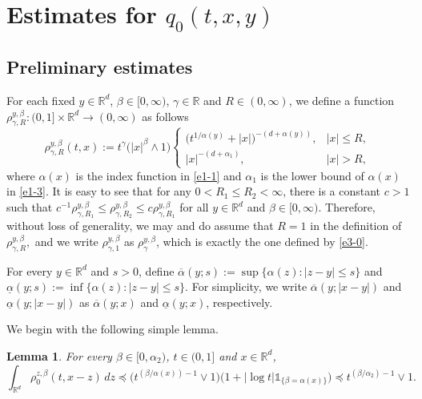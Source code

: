\documentclass[a4paper,11pt]{amsart}
\renewcommand{\le}{\leqslant}
\newcommand{\R}{\mathds R}
\newcommand{\B}{\beta}
\newcommand{\I}{\mathds 1}
\newcommand{\p}{\preceq}
\newcommand{\A}{\alpha}
\newcommand{\G}{\gamma}
\newtheorem{lemma}[theorem]{Lemma}
\theoremstyle{definition}
\begin{document}
\medskip

\section{Estimates for $q_0(t,x,y)$}\label{section2}

\subsection{Preliminary estimates}
For each fixed $y \in \R^d$, $\B \in [0,\infty)$, $\G\in \R$ and $R \in (0,\infty)$, we
define a function
$\rho_{\G,R}^{y,\beta}:(0,1]\times \R^d \rightarrow (0,\infty)$ as follows
\begin{equation*}
\rho_{\G,R}^{y,\beta}(t,x):=t^{\G}\big(|x|^{\beta}\wedge 1\big)
\begin{cases}
 \big(t^{{1/\A(y)}}+|x|\big)^{-(d+\A(y))},&  |x|\le R,\\
 |x|^{-(d+\A_1)},& |x|> R,
\end{cases}
\end{equation*} where $\alpha(x)$ is the index function in \eqref{e1-1} and $\alpha_1$
is the lower bound of $\alpha (x)$  in \eqref{e1-3}.
It is easy to see that for any $0<R_1\le R_2<\infty$, there is a constant $c>1$ such that
$c^{-1}\rho_{\G,R_1}^{y,\beta}\le \rho^{y,\beta}_{\G,R_2}\le
c\rho_{\G,R_1}^{y,\beta}$ for all $y\in \R^d$ and $\beta\in[0,\infty)$.
Therefore, without loss of generality,
we may and do assume that $R=1$ in the definition of
$\rho_{\G,R}^{y,\beta},$ and we write
$\rho_{\G,1}^{y,\beta}$ as $\rho_{\G}^{y,\beta}$, which is exactly the one defined by
\eqref{e3-0}.

For every $y \in \R^d$ and $s>0$, define
$
\overline{\A}(y;s):=\sup\{\A(z): |z-y|\le s\}$ and $  \underline{\A}(y;s):=\inf\{\A(z): |z-y|\le s\}.
$ For simplicity, we write $\overline
\A(y;|x-y|)$ and $\underline{\A}(y;|x-y|)$ as $\overline{\A}(y;x)$ and $\underline{\A}(y;x)$, respectively.

We begin with the following simple lemma.
\begin{lemma}\label{l3-1}
For every $\beta \in [0,\A_2)$, $t \in (0,1]$ and $x \in \R^d$,
\begin{equation}\label{l3-1-1}
\int_{\R^d}\rho_{0}^{z,\beta}(t,x-z)\,dz\p \big(t^{(\beta/\A(x))-1}\vee 1\big)\big(1+|\log t|\I_{\{\B=\A(x)\}}\big)
\p t^{(\B/\A_2)-1}\vee 1.
\end{equation}\end{lemma}
\end{document}
